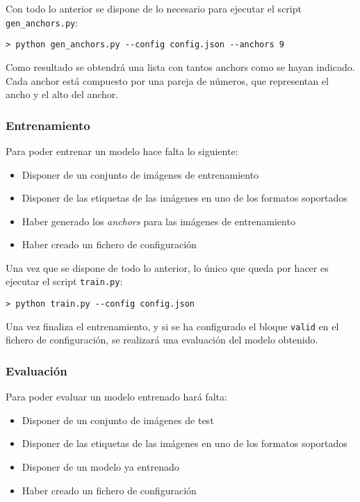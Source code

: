 Con todo lo anterior se dispone de lo necesario para ejecutar el script \texttt{gen\_anchors.py}:

\begin{lstlisting}[frame=single, basicstyle=\ttfamily\footnotesize, caption={Cómo generar los \textit{anchors}}, captionpos=b]
> python gen_anchors.py --config config.json --anchors 9
\end{lstlisting}

Como resultado se obtendrá una lista con tantos anchors como se hayan indicado. Cada anchor está compuesto por una pareja de números, que representan el ancho y el alto del anchor.

\subsubsection*{Entrenamiento}

Para poder entrenar un modelo hace falta lo siguiente:

\begin{itemize}
	\item Disponer de un conjunto de imágenes de entrenamiento
	\item Disponer de las etiquetas de las imágenes en uno de los formatos soportados
	\item Haber generado los \textit{anchors} para las imágenes de entrenamiento
	\item Haber creado un fichero de configuración
\end{itemize}

Una vez que se dispone de todo lo anterior, lo único que queda por hacer es ejecutar el script \texttt{train.py}:

\begin{lstlisting}[frame=single, basicstyle=\ttfamily\footnotesize, caption={Cómo lanzar el entrenamiento}, captionpos=b]
> python train.py --config config.json
\end{lstlisting}

Una vez finaliza el entrenamiento, y si se ha configurado el bloque \texttt{valid} en el fichero de configuración, se realizará una evaluación del modelo obtenido.

\subsubsection*{Evaluación}

Para poder evaluar un modelo entrenado hará falta:

\begin{itemize}
	\item Disponer de un conjunto de imágenes de test
	\item Disponer de las etiquetas de las imágenes en uno de los formatos soportados
	\item Disponer de un modelo ya entrenado
	\item Haber creado un fichero de configuración
\end{itemize}

